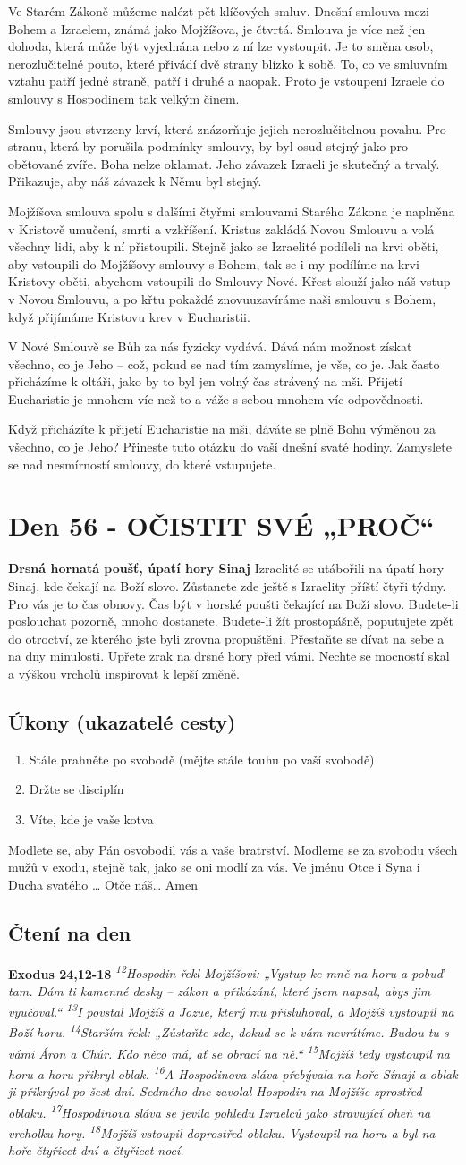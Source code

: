 \documentclass[11pt]{article}
\newcommand{\zacatekOsmyTyden}{
  \textbf{Drsná hornatá poušť, úpatí hory Sinaj} \newline 
  Izraelité se utábořili na úpatí hory Sinaj, kde čekají na Boží slovo. Zůstanete zde ještě s Izraelity příští čtyři týdny. Pro vás je to čas obnovy. Čas být v horské poušti čekající na Boží slovo. Budete-li poslouchat pozorně, mnoho dostanete. Budete-li žít prostopášně, poputujete zpět do otroctví, ze kterého jste byli zrovna propuštěni. Přestaňte se dívat na sebe a na dny minulosti. Upřete zrak na drsné hory před vámi. Nechte se mocností skal a výškou vrcholů inspirovat k lepší změně.
  \subsection*{Úkony (ukazatelé cesty)}
\begin{enumerate}
  \item Stále prahněte po svobodě (mějte stále touhu po vaší svobodě)
  \item Držte se disciplín
  \item Víte, kde je vaše kotva
\end{enumerate}
Modlete se, aby Pán osvobodil vás a vaše bratrství. \newline
Modleme se za svobodu všech mužů v exodu, stejně tak, jako se oni modlí za vás.\newline
Ve jménu Otce i Syna i Ducha svatého …  Otče náš… Amen
}
\begin{document}
Ve Starém Zákoně můžeme nalézt pět klíčových smluv. Dnešní smlouva mezi Bohem a Izraelem, známá
jako Mojžíšova, je čtvrtá. Smlouva je více než jen dohoda, která může být vyjednána nebo z ní lze vystoupit.
Je to směna osob, nerozlučitelné pouto, které přivádí dvě strany blízko k sobě. To, co ve smluvním vztahu
patří jedné straně, patří i druhé a naopak. Proto je vstoupení Izraele do smlouvy s Hospodinem tak velkým
činem.

Smlouvy jsou stvrzeny krví, která znázorňuje jejich nerozlučitelnou povahu. Pro stranu, která by porušila
podmínky smlouvy, by byl osud stejný jako pro obětované zvíře. Boha nelze oklamat. Jeho závazek Izraeli je
skutečný a trvalý. Přikazuje, aby náš závazek k Němu byl stejný.

Mojžíšova smlouva spolu s dalšími čtyřmi smlouvami Starého Zákona je naplněna v Kristově umučení, smrti
a vzkříšení. Kristus zakládá Novou Smlouvu a volá všechny lidi, aby k ní přistoupili. Stejně jako se Izraelité
podíleli na krvi oběti, aby vstoupili do Mojžíšovy smlouvy s Bohem, tak se i my podílíme na krvi Kristovy
oběti, abychom vstoupili do Smlouvy Nové. Křest slouží jako náš vstup v Novou Smlouvu, a po křtu
pokaždé znovuuzavíráme naši smlouvu s Bohem, když přijímáme Kristovu krev v Eucharistii.

V Nové Smlouvě se Bůh za nás fyzicky vydává. Dává nám možnost získat všechno, co je Jeho – což, pokud
se nad tím zamyslíme, je vše, co je. Jak často přicházíme k oltáři, jako by to byl jen volný čas strávený na
mši. Přijetí Eucharistie je mnohem víc než to a váže s sebou mnohem víc odpovědnosti.

Když přicházíte k přijetí Eucharistie na mši, dáváte se plně Bohu výměnou za všechno, co je Jeho? Přineste
tuto otázku do vaší dnešní svaté hodiny. Zamyslete se nad nesmírností smlouvy, do které vstupujete.

\newpage
\section{Den 56 - OČISTIT SVÉ „PROČ“ }
\zacatekOsmyTyden
\subsection*{Čtení na den}
\textbf{Exodus 24,12-18}
\newline
\textit{
\textsuperscript{12}Hospodin řekl Mojžíšovi: „Vystup ke mně na horu a pobuď tam. Dám ti kamenné desky – zákon a přikázání, které jsem napsal, abys jim vyučoval.“
\textsuperscript{13}I povstal Mojžíš a Jozue, který mu přisluhoval, a Mojžíš vystoupil na Boží horu.
\textsuperscript{14}Starším řekl: „Zůstaňte zde, dokud se k vám nevrátíme. Budou tu s vámi Áron a Chúr. Kdo něco má, ať se obrací na ně.“
\textsuperscript{15}Mojžíš tedy vystoupil na horu a horu přikryl oblak.
\textsuperscript{16}A Hospodinova sláva přebývala na hoře Sínaji a oblak ji přikrýval po šest dní. Sedmého dne zavolal Hospodin na Mojžíše zprostřed oblaku.
\textsuperscript{17}Hospodinova sláva se jevila pohledu Izraelců jako stravující oheň na vrcholku hory.
\textsuperscript{18}Mojžíš vstoupil doprostřed oblaku. Vystoupil na horu a byl na hoře čtyřicet dní a čtyřicet nocí.
}
\end{document}
